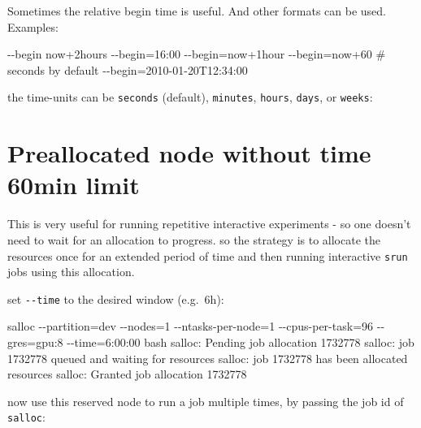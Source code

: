 \documentclass[
]{report}
\newenvironment{Shaded}{\begin{snugshade}}{\end{snugshade}}
\newcommand{\AttributeTok}[1]{\textcolor[rgb]{0.40,0.45,0.13}{#1}}
\newcommand{\CommentTok}[1]{\textcolor[rgb]{0.37,0.37,0.37}{#1}}
\newcommand{\ExtensionTok}[1]{\textcolor[rgb]{0.00,0.23,0.31}{#1}}
\newcommand{\NormalTok}[1]{\textcolor[rgb]{0.00,0.23,0.31}{#1}}
\newcommand{\OperatorTok}[1]{\textcolor[rgb]{0.37,0.37,0.37}{#1}}
\begin{document}
Sometimes the relative begin time is useful. And other formats can be
used. Examples:

\begin{Shaded}
\begin{Highlighting}[]
\ExtensionTok{{-}{-}begin}\NormalTok{ now+2hours}
\ExtensionTok{{-}{-}begin=16:00}
\ExtensionTok{{-}{-}begin=now+1hour}
\ExtensionTok{{-}{-}begin=now+60}  \CommentTok{\# seconds by default}
\ExtensionTok{{-}{-}begin=2010{-}01{-}20T12:34:00}
\end{Highlighting}
\end{Shaded}

the time-units can be \texttt{seconds} (default), \texttt{minutes},
\texttt{hours}, \texttt{days}, or \texttt{weeks}:

\section{Preallocated node without time 60min
limit}\label{preallocated-node-without-time-60min-limit}

This is very useful for running repetitive interactive experiments - so
one doesn't need to wait for an allocation to progress. so the strategy
is to allocate the resources once for an extended period of time and
then running interactive \texttt{srun} jobs using this allocation.

set \texttt{-\/-time} to the desired window (e.g.~6h):

\begin{Shaded}
\begin{Highlighting}[]
\ExtensionTok{salloc} \AttributeTok{{-}{-}partition}\OperatorTok{=}\NormalTok{dev }\AttributeTok{{-}{-}nodes}\OperatorTok{=}\NormalTok{1 }\AttributeTok{{-}{-}ntasks{-}per{-}node}\OperatorTok{=}\NormalTok{1 }\AttributeTok{{-}{-}cpus{-}per{-}task}\OperatorTok{=}\NormalTok{96 }\AttributeTok{{-}{-}gres}\OperatorTok{=}\NormalTok{gpu:8 }\AttributeTok{{-}{-}time}\OperatorTok{=}\NormalTok{6:00:00 bash}
\ExtensionTok{salloc:}\NormalTok{ Pending job allocation 1732778}
\ExtensionTok{salloc:}\NormalTok{ job 1732778 queued and waiting for resources}
\ExtensionTok{salloc:}\NormalTok{ job 1732778 has been allocated resources}
\ExtensionTok{salloc:}\NormalTok{ Granted job allocation 1732778}
\end{Highlighting}
\end{Shaded}

now use this reserved node to run a job multiple times, by passing the
job id of \texttt{salloc}:
\end{document}
